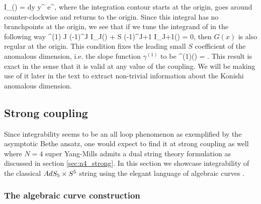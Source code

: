 \beq
	I_\nu(\Lambda) =  \oint dy \; y^{} e^{\Lambda {}},
\eeq
where the integration contour starts at the origin, goes around counter-clockwise and returns to the origin. 
Since this integral has no branchpoints at the origin, we see that if we tune the integrand of  in the following way
\beq
	\gamma^{(1)} J (-1)^J I_J(\Lambda) + \Lambda S (-1)^{J+1} I_{J+1}(\Lambda) = 0,
\eeq
then $G(x)$ is also regular at the origin. 
This condition fixes the leading small $S$ coefficient of the anomalous dimension, i.e. the slope function $\gamma^{(1)}$ to be
\beq
	\label{eq:slope_function}
	\gamma^{(1)}(\Lambda) =  .
\eeq
This result is exact in the sense that it is valid at any value of the coupling.
We will be making use of it later in the text to extract non-trivial information about the Konishi anomalous dimension.

\subsection{Strong coupling}
\label{sec:integrability_strong}

Since integrability seems to be an all loop phenomenon as exemplified by the asymptotic Bethe ansatz, one would expect to find it at strong coupling as well where $N=4$ super Yang-Mills admits a dual string theory formulation as discussed in section \ref{sec:n4_strong}. 
In this section we showcase integrability of the classical $AdS_5 \times S^5$ string using the elegant language of algebraic curves \cite{Kazakov:2004qf,Beisert:2005bm}. 

\subsubsection{The algebraic curve construction}

